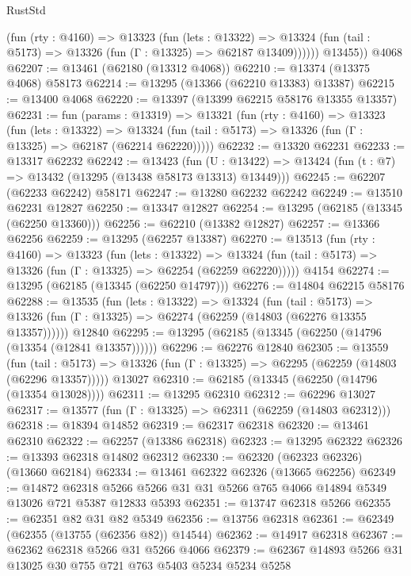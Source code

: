 \begin{lexlean}{RustStd}
\begin{coremodule}
            (fun (rty : @4160) =>
            @13323
              (fun (lets : @13322) =>
              @13324 (fun (tail : @5173) => @13326 (fun (Γ : @13325) => @62187 @13409))))))
        @13455))
    @4068
@62207 := @13461 (@62180 (@13312 @4068))
@62210 := @13374 (@13375 @4068) @58173
@62214 := @13295 (@13366 (@62210 @13383) @13387)
@62215 := @13400 @4068
@62220 := @13397 (@13399 @62215 @58176 @13355 @13357)
@62231 := fun (params : @13319) =>
  @13321
    (fun (rty : @4160) =>
    @13323
      (fun (lets : @13322) =>
      @13324 (fun (tail : @5173) => @13326 (fun (Γ : @13325) => @62187 (@62214 @62220)))))
@62232 := @13320 @62231
@62233 := @13317 @62232
@62242 := @13423
    (fun (U : @13422) => @13424 (fun (t : @7) => @13432 (@13295 (@13438 @58173 @13313) @13449)))
@62245 := @62207 (@62233 @62242) @58171
@62247 := @13280 @62232 @62242
@62249 := @13510 @62231 @12827
@62250 := @13347 @12827
@62254 := @13295 (@62185 (@13345 (@62250 @13360)))
@62256 := @62210 (@13382 @12827)
@62257 := @13366 @62256
@62259 := @13295 (@62257 @13387)
@62270 := @13513
    (fun (rty : @4160) =>
    @13323
      (fun (lets : @13322) =>
      @13324 (fun (tail : @5173) => @13326 (fun (Γ : @13325) => @62254 (@62259 @62220)))))
    @4154
@62274 := @13295 (@62185 (@13345 (@62250 @14797)))
@62276 := @14804 @62215 @58176
@62288 := @13535
    (fun (lets : @13322) =>
    @13324
      (fun (tail : @5173) =>
      @13326 (fun (Γ : @13325) => @62274 (@62259 (@14803 (@62276 @13355 @13357))))))
    @12840
@62295 := @13295 (@62185 (@13345 (@62250 (@14796 (@13354 (@12841 @13357))))))
@62296 := @62276 @12840
@62305 := @13559
    (fun (tail : @5173) => @13326 (fun (Γ : @13325) => @62295 (@62259 (@14803 (@62296 @13357)))))
    @13027
@62310 := @62185 (@13345 (@62250 (@14796 (@13354 @13028))))
@62311 := @13295 @62310
@62312 := @62296 @13027
@62317 := @13577 (fun (Γ : @13325) => @62311 (@62259 (@14803 @62312)))
@62318 := @18394 @14852
@62319 := @62317 @62318
@62320 := @13461 @62310
@62322 := @62257 (@13386 @62318)
@62323 := @13295 @62322
@62326 := @13393 @62318 @14802 @62312
@62330 := @62320 (@62323 @62326) (@13660 @62184)
@62334 := @13461 @62322 @62326 (@13665 @62256)
@62349 := @14872
    @62318
    @5266
    @5266
    @31
    @31
    @5266
    @765
    @4066
    @14894
    @5349
    @13026
    @721
    @5387
    @12833
    @5393
@62351 := @13747 @62318 @5266
@62355 := @62351 @82 @31 @82 @5349
@62356 := @13756 @62318
@62361 := @62349 (@62355 (@13755 (@62356 @82)) @14544)
@62362 := @14917 @62318
@62367 := @62362 @62318 @5266 @31 @5266 @4066
@62379 := @62367 @14893 @5266 @31 @13025 @30 @755 @721 @763 @5403 @5234 @5234 @5258

\end{coremodule}
\end{lexlean}
